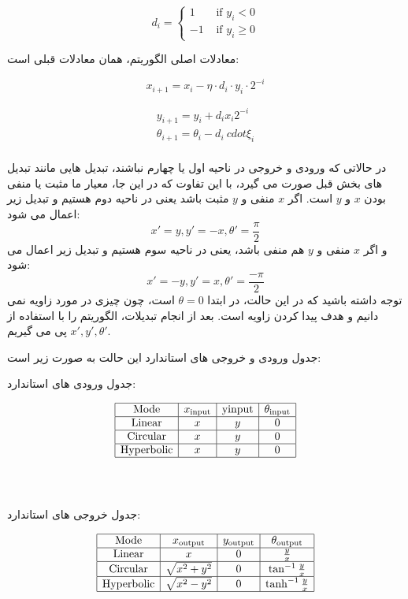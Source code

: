 \documentclass[12pt,titlepage,a4page , tikz , multi,table , svgnames,xcdraw]{article}
\begin{document}
$$d_{i}=\left\{\begin{array}{ll}
1 & \text { if } y_{i}<0 \\
-1 & \text { if } y_{i} \geq 0
\end{array}\right.$$

\newpage
معادلات اصلی الگوریتم، همان معادلات قبلی است:

$$x_{i+1}=x_{i}- \eta \cdot d_{i} \cdot y_{i} \cdot 2^{-i}$$

$$\begin{array}{c}
y_{i+1}=y_{i}+d_{i} x_{i} 2^{-i} \\
\theta_{i+1}=\theta_{i}-d_{i} \ cdot \xi_i \\
\end{array}$$


در حالاتی که ورودی و خروجی در ناحیه اول یا چهارم نباشند، تبدیل هایی مانند تبدیل های بخش قبل صورت می گیرد، با این تفاوت که در این جا، معیار ما مثبت یا منفی بودن $x$ و $y$ است. اگر $x$ منفی و $y$ مثبت باشد یعنی در ناحیه دوم هستیم و تبدیل زیر اعمال می شود:
$$x' = y , y' = -x , \theta' =  \frac{\pi}{2}$$
و اگر $x$ منفی و $y$ هم منفی باشد، یعنی در ناحیه سوم هستیم و تبدیل زیر اعمال می شود:
$$x' = -y , y' = x , \theta' =  \frac{-\pi}{2}$$
توجه داشته باشید که در این حالت، در ابتدا $\theta =0$ است، چون چیزی در مورد زاویه نمی دانیم و هدف پیدا کردن زاویه است. بعد از انجام تبدیلات، الگوریتم را با استفاده از $x' , y' , \theta'$ پی می گیریم.


جدول ورودی و خروجی های استاندارد این حالت به صورت زیر است:


\begin{center}
جدول ورودی های استاندارد:
\end{center}
$$\begin{array}{|c|c|c|c|}
\hline \text { Mode } & x_{\text {input}} & \text {yinput} & \theta_{\text {input}} \\
\hline \text {Linear} & x & y & 0 \\
\hline \text {Circular} & x & y & 0 \\
\hline \text {Hyperbolic} & x & y & 0 \\
\hline
\end{array}$$
\\
\\
\begin{center}
جدول خروجی های استاندارد:
\end{center}

$$\begin{array}{|c|c|c|c|}
\hline \text { Mode } & x_{\text {output}} & y_\text{output} & \theta_{\text {output}} \\
\hline \text {Linear} & x & 0 & \frac{y}{x} \\
\hline \text {Circular} & \sqrt{x^{2}+y^{2}} & 0 & \tan ^{-1} \frac{y}{x} \\
\hline \text {Hyperbolic} & \sqrt{x^{2}-y^{2}} & 0 & \tanh ^{-1} \frac{y}{x} \\
\hline
\end{array}$$
\end{document}
